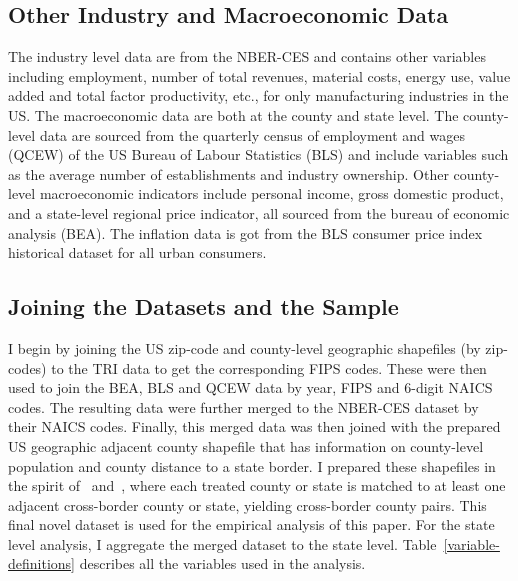 \documentclass[12pt, english]{article}
\begin{document}
    \subsection{Other Industry and Macroeconomic Data}\label{subsec:other-industry-and-macroeconomic-data}
    The industry level data are from the NBER-CES and contains other variables including employment, number of total revenues, material costs, energy use, value added and total factor productivity, etc., for only manufacturing industries in the US. The macroeconomic data are both at the county and state level. The county-level data are sourced from the quarterly census of employment and wages (QCEW) of the US Bureau of Labour Statistics (BLS) and include variables such as the average number of establishments and industry ownership. Other county-level macroeconomic indicators include personal income, gross domestic product, and a state-level regional price indicator, all sourced from the bureau of economic analysis (BEA). The inflation data is got from the BLS consumer price index historical dataset for all urban consumers.

    \subsection{Joining the Datasets and the Sample}\label{subsec:joining-the-datasets-and-the-sample}
    I begin by joining the US zip-code and county-level geographic shapefiles (by zip-codes) to the TRI data to get the corresponding FIPS codes. These were then used to join the BEA, BLS and QCEW data by year, FIPS and $6$-digit NAICS codes. The resulting data were further merged to the NBER-CES dataset by their NAICS codes. Finally, this merged data was then joined with the prepared US geographic adjacent county shapefile that has information on county-level population and county distance to a state border. I prepared these shapefiles in the spirit of~\cite{dube2010minimum} and~\cite{gopalan2021state}, where each treated county or state is matched to at least one adjacent cross-border county or state, yielding cross-border county pairs. This final novel dataset is used for the empirical analysis of this paper. For the state level analysis, I aggregate the merged dataset to the state level. Table~\ref{variable-definitions} describes all the variables used in the analysis.
\end{document}
